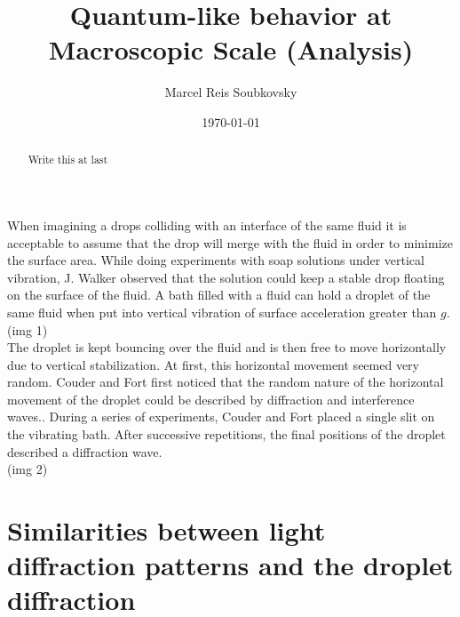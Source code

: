 \documentclass[
 reprint,
 amsmath,amssymb,
pra,
]{revtex4-1}
\begin{document}
\title{Quantum-like behavior at Macroscopic Scale (Analysis)}%

\author{Marcel Reis Soubkovsky}
%

\date{\today}%

\begin{abstract}
Write this at last

\end{abstract}

\maketitle


When imagining a drops colliding with an interface of the same fluid it is acceptable to assume that the drop will merge with the fluid in order to minimize the surface area.
While doing experiments with soap solutions under vertical vibration, J. Walker observed that the solution could keep a stable drop floating on the surface of the fluid.\cite{walker_drops_nodate}
A bath filled with a fluid can hold a droplet of the same fluid when put into vertical vibration of surface acceleration greater than $g$.\cite{couder_bouncing_2005}
 \\
(img 1)
\\
The droplet is kept bouncing over the fluid and is then free to move horizontally due to vertical stabilization. At first, this horizontal movement seemed very random. Couder and Fort first noticed that the random nature of the horizontal movement of the droplet could be described by diffraction and interference waves.\cite{couder_single-particle_2006}. During a series of experiments, Couder and Fort placed a single slit on the vibrating bath. After successive repetitions, the final positions of the droplet described a diffraction wave.
\\
(img 2)
\\



\section{Similarities between light diffraction patterns and the droplet diffraction}
\end{document}
